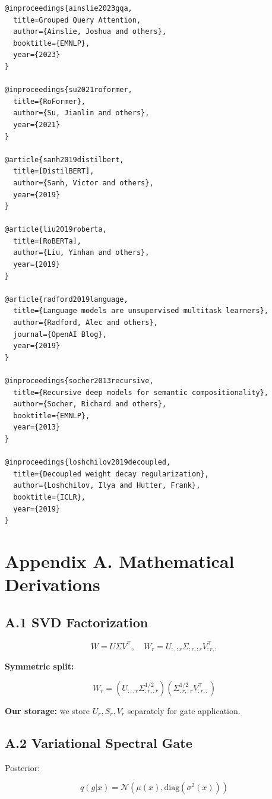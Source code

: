 \begin{lstlisting}
@inproceedings{ainslie2023gqa,
  title=Grouped Query Attention,
  author={Ainslie, Joshua and others},
  booktitle={EMNLP},
  year={2023}
}

@inproceedings{su2021roformer,
  title={RoFormer},
  author={Su, Jianlin and others},
  year={2021}
}

@article{sanh2019distilbert,
  title=[DistilBERT],
  author={Sanh, Victor and others},
  year={2019}
}

@article{liu2019roberta,
  title=[RoBERTa],
  author={Liu, Yinhan and others},
  year={2019}
}

@article{radford2019language,
  title={Language models are unsupervised multitask learners},
  author={Radford, Alec and others},
  journal={OpenAI Blog},
  year={2019}
}

@inproceedings{socher2013recursive,
  title={Recursive deep models for semantic compositionality},
  author={Socher, Richard and others},
  booktitle={EMNLP},
  year={2013}
}

@inproceedings{loshchilov2019decoupled,
  title={Decoupled weight decay regularization},
  author={Loshchilov, Ilya and Hutter, Frank},
  booktitle={ICLR},
  year={2019}
}
\end{lstlisting}



\section{Appendix A. Mathematical Derivations}

\subsection{A.1 SVD Factorization}

\[
W = U \Sigma V^\top, \quad W_r = U_{:, :r} \Sigma_{:r, :r} V_{:r, :}^\top
\tag{A.1}
\]

\textbf{Symmetric split:}

\[
W_r = (U_{:, :r} \Sigma_{:r, :r}^{1/2}) (\Sigma_{:r, :r}^{1/2} V_{:r, :}^\top)
\tag{A.2}
\]

\textbf{Our storage:} we store $U_r, S_r, V_r$ separately for gate application.

\subsection{A.2 Variational Spectral Gate}

Posterior:

\[
q(g | x) = \mathcal{N}(\mu(x), \text{diag}(\sigma^2(x)))
\tag{A.3}
\]

